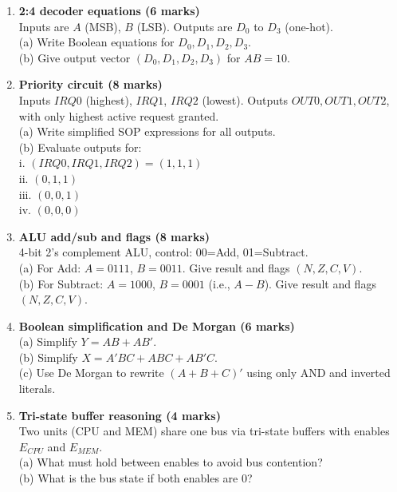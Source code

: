 \documentclass[11pt]{article}
\begin{document}
\begin{enumerate}[label=\textbf{B\arabic*.}]
  \item \textbf{2:4 decoder equations (6 marks)}\\
  Inputs are $A$ (MSB), $B$ (LSB). Outputs are $D_0$ to $D_3$ (one-hot).\\
  (a) Write Boolean equations for $D_0,D_1,D_2,D_3$.\\
  (b) Give output vector $(D_0,D_1,D_2,D_3)$ for $AB=10$.

  \item \textbf{Priority circuit (8 marks)}\\
  Inputs $IRQ0$ (highest), $IRQ1$, $IRQ2$ (lowest). Outputs $OUT0,OUT1,OUT2$, with only highest active request granted.\\
  (a) Write simplified SOP expressions for all outputs.\\
  (b) Evaluate outputs for:\\
  i. $(IRQ0,IRQ1,IRQ2)=(1,1,1)$\\
  ii. $(0,1,1)$\\
  iii. $(0,0,1)$\\
  iv. $(0,0,0)$

  \item \textbf{ALU add/sub and flags (8 marks)}\\
  4-bit 2's complement ALU, control: 00=Add, 01=Subtract.\\
  (a) For Add: $A=0111$, $B=0011$. Give result and flags $(N,Z,C,V)$.\\
  (b) For Subtract: $A=1000$, $B=0001$ (i.e., $A-B$). Give result and flags $(N,Z,C,V)$.

  \item \textbf{Boolean simplification and De Morgan (6 marks)}\\
  (a) Simplify $Y=AB+AB'$.\\
  (b) Simplify $X=A'BC + ABC + AB'C$.\\
  (c) Use De Morgan to rewrite $(A+B+C)'$ using only AND and inverted literals.

  \item \textbf{Tri-state buffer reasoning (4 marks)}\\
  Two units (CPU and MEM) share one bus via tri-state buffers with enables $E_{CPU}$ and $E_{MEM}$.\\
  (a) What must hold between enables to avoid bus contention?\\
  (b) What is the bus state if both enables are 0?\\
\end{enumerate}
\end{document}
